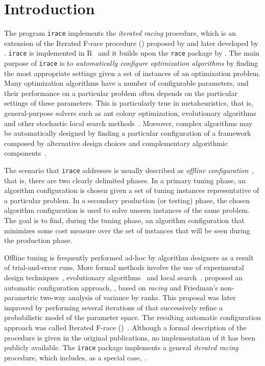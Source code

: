 \documentclass[a4paper]{article}
\newcommand{\irace}{\texttt{irace}\xspace}
\newcommand{\aR}{\textsf{R}\xspace}
\newcommand{\IFRACE}{\text{I/F-Race}\xspace}
\newcommand{\FRACE}{\text{F-Race}\xspace}
\begin{document}
\section{Introduction}

The program \irace implements the \emph{iterated racing} procedure,
which is an extension of the Iterated F-race procedure (\IFRACE)
proposed by \citet{BalBirStu07} and later developed by
\citet{BirYuaBal2010:emaoa}. \irace is implemented in
\aR~\citep{Rmanual} and it builds upon the \texttt{race} package by
\citet{Birattari09tuning,IRIDIA-2003-037}.
%
The main purpose of \irace is to \emph{automatically configure
  optimization algorithms} by finding the most appropriate settings
given a set of instances of an optimization problem. Many optimization
algorithms have a number of configurable parameters, and their
performance on a particular problem often depends on the particular
settings of these parameters. This is particularly true in
metaheuristics, that is, general-purpose solvers such as ant colony
optimization, evolutionary algorithms and other stochastic local
search methods~\cite{HooStu05sls-mk,Birattari09tuning}. Moreover,
complex algorithms may be automatically designed by finding a
particular configuration of a framework composed by alternative design
choices and complementary algorithmic
components~\cite{KhuXuHooLey2009:satenstein,IRIDIA-2011-003}.

The scenario that \irace addresses is usually described as
\emph{offline configuration}~\citep{Birattari09tuning}, that is, there are two clearly delimited
phases. In a primary tuning  phase, an algorithm
configuration is chosen given a set of tuning instances representative of a
particular problem. In a secondary production (or testing) phase, the
chosen algorithm configuration is used to solve unseen instances of the same problem. The goal is to find, during the tuning phase, an algorithm configuration that minimizes some cost measure over the set of instances that will be seen during the production phase.

Offline tuning is frequently performed ad-hoc by algorithm designers
as a result of trial-and-error runs. More formal methods involve the
use of experimental design techniques~\cite{AdeLag06tuning},
evolutionary algorithms~\cite{NanEib2006gecco} and local
search~\cite{HutHooLeyStu2009jair}. \citet{Birattari09tuning} proposed
an automatic configuration approach, \FRACE, based on \emph{racing}
and Friedman's non-parametric two-way analysis of variance by
ranks. This proposal was later improved by performing several
iterations of \FRACE that successively refine a probabilistic model of
the parameter space. The resulting automatic configuration approach
was called Iterated F-race
(\IFRACE)~\cite{BalBirStu07,BirYuaBal2010:emaoa}. Although a formal
description of the \IFRACE procedure is given in the original
publications, no implementation of it has been publicly available.
The \irace package implements a general \emph{iterated racing}
procedure, which includes, as a special case, \IFRACE.
\end{document}
